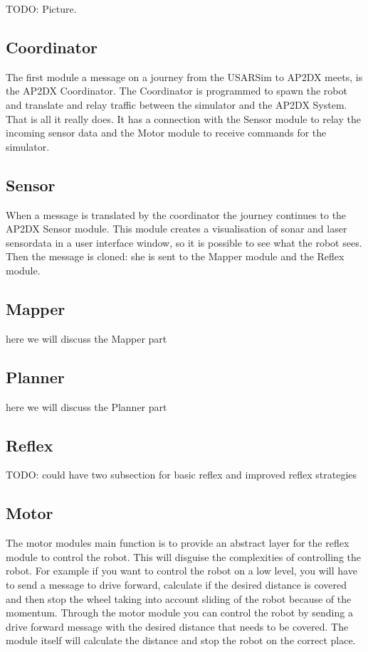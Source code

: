 \documentclass[a4paper,10pt]{article}
\begin{document}
TODO: Picture.

\subsection{Coordinator}
The first module a message on a journey from the USARSim to AP2DX meets, is the AP2DX Coordinator. The Coordinator is programmed to spawn the robot and translate and relay traffic between the simulator and the AP2DX System. That is all it really does. It has a connection with the Sensor module to relay the incoming sensor data and the Motor module to receive commands for the simulator.

\subsection{Sensor}
When a message is translated by the coordinator the journey continues to the AP2DX Sensor module. This module creates a visualisation of sonar and laser sensordata in a user interface window, so it is possible to see what the robot sees. Then the message is cloned: she is sent to the Mapper module and the Reflex module.

\subsection{Mapper}
here we will discuss the Mapper part

\subsection{Planner}
here we will discuss the Planner part

\subsection{Reflex}

TODO: could have two subsection for basic reflex and improved reflex strategies

\subsection{Motor}
The motor modules main function is to provide an abstract layer for the reflex module to control the robot. This will disguise the complexities of controlling the robot. For example if you want to control the robot on a low level, you will have to send a message to drive forward, calculate if the desired distance is covered and then stop the wheel taking into account sliding of the robot because of the momentum. Through the motor module you can control the robot by sending a drive forward message with the desired distance that needs to be covered. The module itself will calculate the distance and stop the robot on the correct place.
\end{document}
